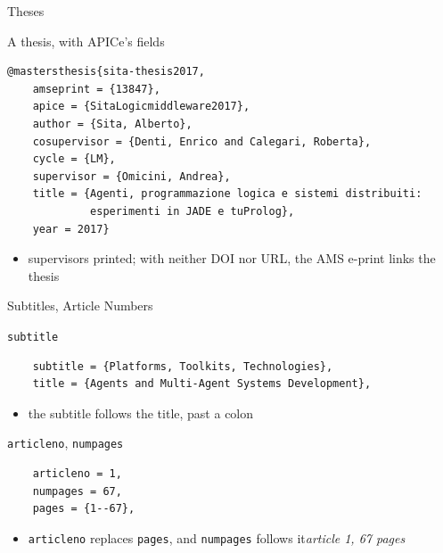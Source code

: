 \documentclass[presentation,\almamaterseal,apice]{beamer}\mode<presentation>{\usetheme{\almamaterpreset}}
\begin{document}
\begin{frame}[c,fragile]{Theses}
%
\begin{block}{A thesis, with APICe's fields}
{\scriptsize\begin{verbatim}
@mastersthesis{sita-thesis2017,
    amseprint = {13847},
    apice = {SitaLogicmiddleware2017},
    author = {Sita, Alberto},
    cosupervisor = {Denti, Enrico and Calegari, Roberta},
    cycle = {LM},
    supervisor = {Omicini, Andrea},
    title = {Agenti, programmazione logica e sistemi distribuiti:
             esperimenti in JADE e tuProlog},
    year = 2017}
\end{verbatim}} %
\begin{itemize}
	\item supervisors printed; with neither DOI nor URL, the AMS e-print links the thesis
\end{itemize}
\end{block}
%
\end{frame}

\begin{frame}[c,fragile]{Subtitles, Article Numbers}
%
\begin{block}{\texttt{subtitle}}
{\scriptsize\begin{verbatim}
    subtitle = {Platforms, Toolkits, Technologies},
    title = {Agents and Multi-Agent Systems Development},
\end{verbatim}} %
\begin{itemize}
	\item the subtitle follows the title, past a colon
\end{itemize}
\end{block}
%
\begin{block}{\texttt{articleno}, \texttt{numpages}}
{\scriptsize\begin{verbatim}
    articleno = 1,
    numpages = 67,
    pages = {1--67},
\end{verbatim}} %
\begin{itemize}
	\item \texttt{articleno} replaces \texttt{pages}, and \texttt{numpages} follows it\textemdash{}\emph{article 1, 67 pages}
\end{itemize}
\end{block}
%
\end{frame}
\end{document}
